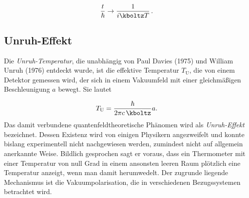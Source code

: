 \begin{equation*}
  \frac{t}{\hbar} \rightarrow \frac{1}{i \kboltz T}\,.
\end{equation*}


\subsection*{Unruh-Effekt}

Die \emph{Unruh-Temperatur}, die unabhängig von Paul Davies (1975) und William Unruh (1976) entdeckt wurde, ist die effektive Temperatur $T_{\text{U}}$, die von einem Detektor gemessen wird, der sich in einem Vakuumfeld mit einer gleichmäßigen Beschleunigung $a$ bewegt. Sie lautet

\begin{equation*}\label{eq:Unruh}
  T_{\text{U}}=\frac{\hbar}{2 \pi c\, \kboltz} a.
\end{equation*}
%
Das damit verbundene quantenfeldtheoretische Phänomen wird als \emph{Unruh-Effekt} bezeichnet. Dessen Existenz wird von einigen Physikern angezweifelt und konnte bislang experimentell nicht nachgewiesen werden, zumindest nicht auf allgemein anerkannte Weise. Bildlich gesprochen sagt er voraus, dass ein Thermometer mit einer Temperatur von null Grad in einem ansonsten leeren Raum plötzlich eine Temperatur anzeigt, wenn man damit herumwedelt. Der zugrunde liegende Mechanismus ist die Vakuumpolarisation, die in verschiedenen Bezugssystemen betrachtet wird.
